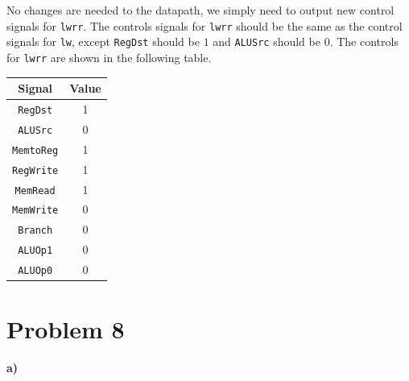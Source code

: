 \documentclass[12pt]{article}
\begin{document}
No changes are needed to the datapath, we simply need to output new control signals for \texttt{lwrr}. The controls signals
for \texttt{lwrr} should be the same as the control signals for \texttt{lw}, except \texttt{RegDst} should be \(1\) and \texttt{ALUSrc}
should be \(0\). The controls for \texttt{lwrr} are shown in the following table.
\begin{center}
        \begin{tabular} {c|c}
                Signal & Value \\
                \hline
                \texttt{RegDst} & 1\\
                \texttt{ALUSrc} & 0\\
                \texttt{MemtoReg} & 1\\
                \texttt{RegWrite} & 1\\
                \texttt{MemRead} & 1\\
                \texttt{MemWrite} & 0\\
                \texttt{Branch} & 0\\
                \texttt{ALUOp1} & 0\\
                \texttt{ALUOp0} & 0
        \end{tabular}
\end{center}

\pagebreak

\section*{Problem 8}

\paragraph{a)}
\end{document}
